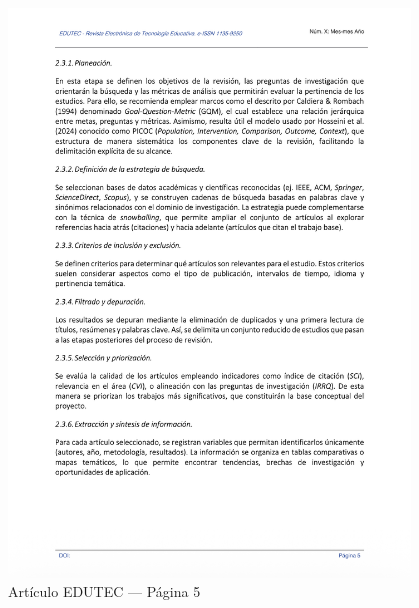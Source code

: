 \begin{figure}[H]
    \centering
    \begin{tcolorbox}[
        colback=white,
        colframe=gray!50,
        boxrule=1pt,
        arc=2pt,
        boxsep=5pt,
        left=3pt,
        right=3pt,
        top=3pt,
        bottom=3pt,
        drop shadow
    ]
        \includegraphics[width=0.95\textwidth,keepaspectratio]{apendices/EDUTEC/5.png}
    \end{tcolorbox}
    \caption{Artículo EDUTEC --- Página 5}\label{fig:edutec-pagina-5}
\end{figure}
\FloatBarrier

